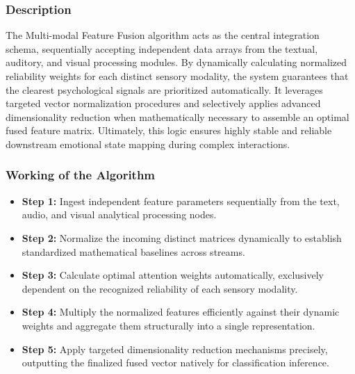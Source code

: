 \documentclass[11pt]{report}
\begin{document}
\subsubsection*{Description}
The Multi-modal Feature Fusion algorithm acts as the central integration schema, sequentially accepting independent data arrays from the textual, auditory, and visual processing modules. By dynamically calculating normalized reliability weights for each distinct sensory modality, the system guarantees that the clearest psychological signals are prioritized automatically. It leverages targeted vector normalization procedures and selectively applies advanced dimensionality reduction when mathematically necessary to assemble an optimal fused feature matrix. Ultimately, this logic ensures highly stable and reliable downstream emotional state mapping during complex interactions.

\subsubsection*{Working of the Algorithm}
\begin{itemize}
    \item \textbf{Step 1:} Ingest independent feature parameters sequentially from the text, audio, and visual analytical processing nodes.
    \item \textbf{Step 2:} Normalize the incoming distinct matrices dynamically to establish standardized mathematical baselines across streams.
    \item \textbf{Step 3:} Calculate optimal attention weights automatically, exclusively dependent on the recognized reliability of each sensory modality.
    \item \textbf{Step 4:} Multiply the normalized features efficiently against their dynamic weights and aggregate them structurally into a single representation.
    \item \textbf{Step 5:} Apply targeted dimensionality reduction mechanisms precisely, outputting the finalized fused vector natively for classification inference.
\end{itemize}
\end{document}
